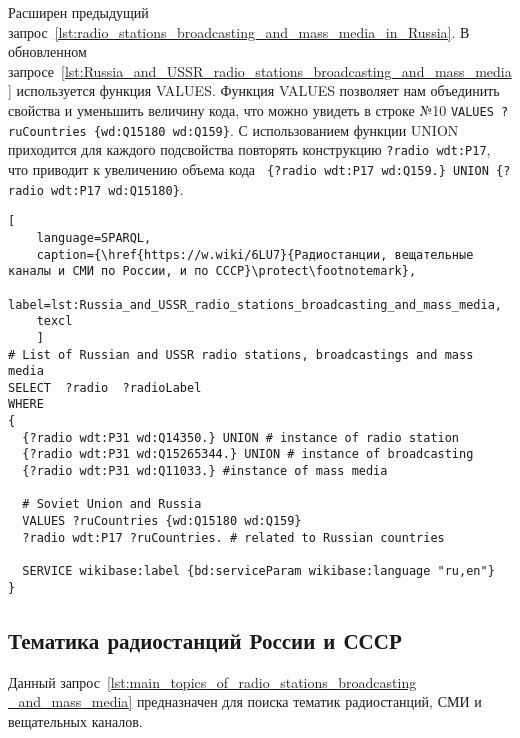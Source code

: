 
\newpage

Расширен предыдущий запрос~\ref{lst:radio_stations_broadcasting_and_mass_media_in_Russia}. В обновленном запросе~\ref{lst:Russia_and_USSR_radio_stations_broadcasting_and_mass_media} используется функция VALUES.  Функция VALUES позволяет нам объединить свойства и уменьшить величину кода, что можно увидеть в строке №10 \lstinline|VALUES ?ruCountries {wd:Q15180 wd:Q159}|. С использованием функции UNION приходится для каждого подсвойства повторять конструкцию \lstinline|?radio wdt:P17|, что приводит к увеличению объема кода \lstinline| {?radio wdt:P17 wd:Q159.} UNION {?radio wdt:P17 wd:Q15180}|.

\begin{lstlisting}[ 
    language=SPARQL,
    caption={\href{https://w.wiki/6LU7}{Радиостанции, вещательные каналы и СМИ по России, и по СССР}\protect\footnotemark},
    label=lst:Russia_and_USSR_radio_stations_broadcasting_and_mass_media,
    texcl
    ]
# List of Russian and USSR radio stations, broadcastings and mass media
SELECT  ?radio  ?radioLabel
WHERE
{
  {?radio wdt:P31 wd:Q14350.} UNION # instance of radio station
  {?radio wdt:P31 wd:Q15265344.} UNION # instance of broadcasting
  {?radio wdt:P31 wd:Q11033.} #instance of mass media
  
  # Soviet Union and Russia
  VALUES ?ruCountries {wd:Q15180 wd:Q159}
  ?radio wdt:P17 ?ruCountries. # related to Russian countries
  
  SERVICE wikibase:label {bd:serviceParam wikibase:language "ru,en"}
}\end{lstlisting}%


\newpage

\subsection{Тематика радиостанций России и СССР}

Данный запрос~\ref{lst:main_topics_of_radio_stations_broadcasting _and_mass_media} предназначен для поиска тематик радиостанций, СМИ и вещательных каналов.

